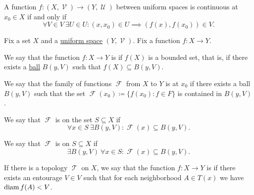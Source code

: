 \begin{corollary}\label{thm:uniform_space_local_continuity}
  A function \( f: (X, \mscrV) \to (Y, \mscrU) \) between uniform spaces is continuous at \( x_0 \in X \) if and only if
  \begin{equation*}
    \forall V \in V \ \exists U \in U : (x, x_0) \in U \implies (f(x), f(x_0)) \in V.
  \end{equation*}
\end{corollary}

\begin{definition}\label{def:bounded_function}
  Fix a set \( X \) and a \hyperref[def:uniform_space]{uniform space} \( (Y, \mscrV) \). Fix a function \( f: X \to Y \).

  \begin{thmenum}
     We say that the function \( f: X \to Y \) is  if \( f(X) \) is a bounded set, that is, if there exists a \hyperref[def:entourage/ball]{ball} \( B(y, V) \) such that \( f(X) \subseteq B(y, V) \).

     We say that the family of functions \( \mscrF \) from \( X \) to \( Y \) is  at \( x_0 \) if there exists a ball \( B(y, V) \) such that the set \( \mscrF(x_0) \coloneqq \{ f(x_0) \colon f \in F \} \) is contained in \( B(y, V) \).

     We say that \( \mscrF \) is  on the set \( S \subseteq X \) if
    \begin{equation*}
      \forall x \in S \ \exists B(y, V) : \mscrF(x) \subseteq B(y, V).
    \end{equation*}

     We say that \( \mscrF \) is  on \( S \subseteq X \) if
    \begin{equation*}
      \exists B(y, V) \ \forall x \in S : \mscrF(x) \subseteq B(y, V).
    \end{equation*}

     If there is a topology \( \mscrT \) on \( X \), we say that the function \( f: X \to Y \) is  if there exists an entourage \( V \in V \) such that for each neighborhood \( A \in T(x) \) we have \( \operatorname{diam}{f(A)} < V \).
  \end{thmenum}
\end{definition}


